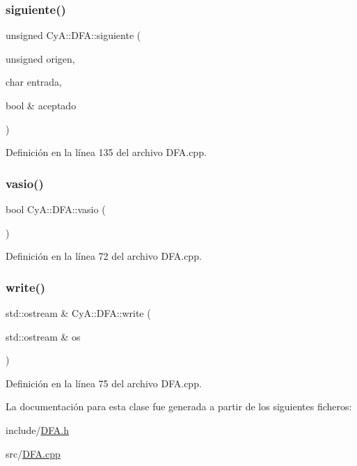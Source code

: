 \subsubsection{\texorpdfstring{siguiente()}{siguiente()}}
{\footnotesize\ttfamily unsigned Cy\+A\+::\+D\+F\+A\+::siguiente (\begin{DoxyParamCaption}\item[{unsigned}]{origen,  }\item[{char}]{entrada,  }\item[{bool \&}]{aceptado }\end{DoxyParamCaption})}



Definición en la línea 135 del archivo D\+F\+A.\+cpp.

\mbox{\label{class_cy_a_1_1_d_f_a_ac5d949a88b7e56236e710848fdadc413}} 
\subsubsection{\texorpdfstring{vasio()}{vasio()}}
{\footnotesize\ttfamily bool Cy\+A\+::\+D\+F\+A\+::vasio (\begin{DoxyParamCaption}{ }\end{DoxyParamCaption})}



Definición en la línea 72 del archivo D\+F\+A.\+cpp.

\mbox{\label{class_cy_a_1_1_d_f_a_a3a16e67349ab36756e3d9c7108b91e56}} 
\subsubsection{\texorpdfstring{write()}{write()}}
{\footnotesize\ttfamily std\+::ostream \& Cy\+A\+::\+D\+F\+A\+::write (\begin{DoxyParamCaption}\item[{std\+::ostream \&}]{os }\end{DoxyParamCaption})}



Definición en la línea 75 del archivo D\+F\+A.\+cpp.



La documentación para esta clase fue generada a partir de los siguientes ficheros\+:\begin{DoxyCompactItemize}
\item 
include/\mbox{\hyperlink{_d_f_a_8h}{D\+F\+A.\+h}}\item 
src/\mbox{\hyperlink{_d_f_a_8cpp}{D\+F\+A.\+cpp}}\end{DoxyCompactItemize}
